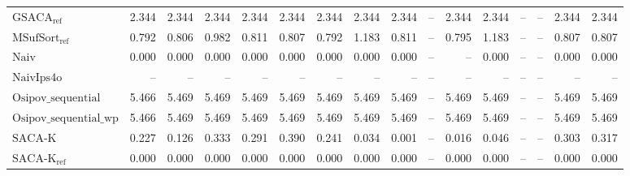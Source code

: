\begin{table}[h]
{\begin{tabular}{lrrrrrrrrrrrrrrr}
    $\text{GSACA}_{\text{ref}}$ & 2.344 & 2.344 & 2.344 & 2.344 & 2.344 & 2.344 & 2.344 & 2.344 & {\color{darkgray}--} & 2.344 & 2.344 & {\color{darkgray}--} & {\color{darkgray}--} & 2.344 & 2.344 \\
    $\text{MSufSort}_{\text{ref}}$ & 0.792 & 0.806 & 0.982 & 0.811 & 0.807 & 0.792 & 1.183 & 0.811 & {\color{darkgray}--} & 0.795 & 1.183 & {\color{darkgray}--} & {\color{darkgray}--} & 0.807 & 0.807 \\
    $\text{Naiv}$ & {\color{green!60!black}0.000} & {\color{green!60!black}0.000} & {\color{green!60!black}0.000} & {\color{green!60!black}0.000} & {\color{green!60!black}0.000} & {\color{green!60!black}0.000} & {\color{green!60!black}0.000} & {\color{green!60!black}0.000} & {\color{darkgray}--} & {\color{darkgray}--} & {\color{green!60!black}0.000} & {\color{darkgray}--} & {\color{darkgray}--} & {\color{green!60!black}0.000} & {\color{green!60!black}0.000} \\
    $\text{NaivIps4o}$ & {\color{darkgray}--} & {\color{darkgray}--} & {\color{darkgray}--} & {\color{darkgray}--} & {\color{darkgray}--} & {\color{darkgray}--} & {\color{darkgray}--} & {\color{darkgray}--} & {\color{darkgray}--} & {\color{darkgray}--} & {\color{darkgray}--} & {\color{darkgray}--} & {\color{darkgray}--} & {\color{darkgray}--} & {\color{darkgray}--} \\
    $\text{Osipov\_sequential}$ & {\color{red}5.466} & {\color{red}5.469} & {\color{red}5.469} & {\color{red}5.469} & {\color{red}5.469} & {\color{red}5.469} & {\color{red}5.469} & {\color{red}5.469} & {\color{darkgray}--} & {\color{red}5.469} & {\color{red}5.469} & {\color{darkgray}--} & {\color{darkgray}--} & {\color{red}5.469} & {\color{red}5.469} \\
    $\text{Osipov\_sequential\_wp}$ & {\color{red}5.466} & {\color{red}5.469} & {\color{red}5.469} & {\color{red}5.469} & {\color{red}5.469} & {\color{red}5.469} & {\color{red}5.469} & {\color{red}5.469} & {\color{darkgray}--} & {\color{red}5.469} & {\color{red}5.469} & {\color{darkgray}--} & {\color{darkgray}--} & {\color{red}5.469} & {\color{red}5.469} \\
    $\text{SACA-K}$ & 0.227 & 0.126 & 0.333 & 0.291 & 0.390 & 0.241 & 0.034 & 0.001 & {\color{darkgray}--} & 0.016 & 0.046 & {\color{darkgray}--} & {\color{darkgray}--} & 0.303 & 0.317 \\
    $\text{SACA-K}_{\text{ref}}$ & {\color{green!60!black}0.000} & {\color{green!60!black}0.000} & {\color{green!60!black}0.000} & {\color{green!60!black}0.000} & {\color{green!60!black}0.000} & {\color{green!60!black}0.000} & {\color{green!60!black}0.000} & {\color{green!60!black}0.000} & {\color{darkgray}--} & {\color{green!60!black}0.000} & {\color{green!60!black}0.000} & {\color{darkgray}--} & {\color{darkgray}--} & {\color{green!60!black}0.000} & {\color{green!60!black}0.000} \\

\end{tabular}}
\end{table}
